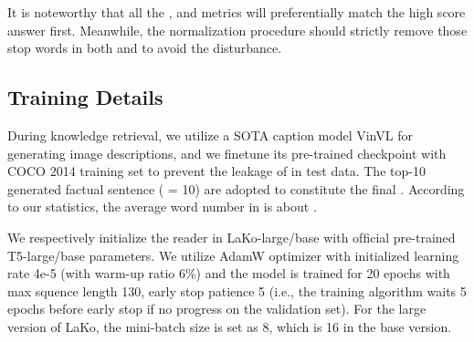 \documentclass[sigconf]{acmart}
\newcommand{\cjy}[1]{{\color{black}#1}}
\begin{document}
It is noteworthy that all the ,  and  metrics will preferentially match the high score answer first. Meanwhile, the normalization procedure should strictly remove those stop words in both  and  to avoid the disturbance.

\subsection{Training Details}
During knowledge retrieval, we utilize a SOTA caption model VinVL \citep{DBLP:conf/cvpr/ZhangLHY0WCG21} for \cjy{generating image descriptions, and we finetune its pre-trained checkpoint with COCO 2014 training set to prevent the leakage of  in test data.
The top-10 generated factual sentence  ( = 10) are adopted to constitute the final .}
According to our statistics, the average word number in  is about .

We respectively initialize the reader in LaKo-large/base with ofﬁcial pre-trained T5-large/base parameters.
We utilize AdamW optimizer with initialized learning rate 4e-5 (with warm-up ratio 6\%) and the model is trained for 20 epochs with max squence length 130, early stop patience 5 (i.e., the training algorithm waits 5 epochs before early stop if no progress on the validation set).
For the large version of LaKo, the mini-batch size is set as 8, which is 16 in the base version.
\end{document}
